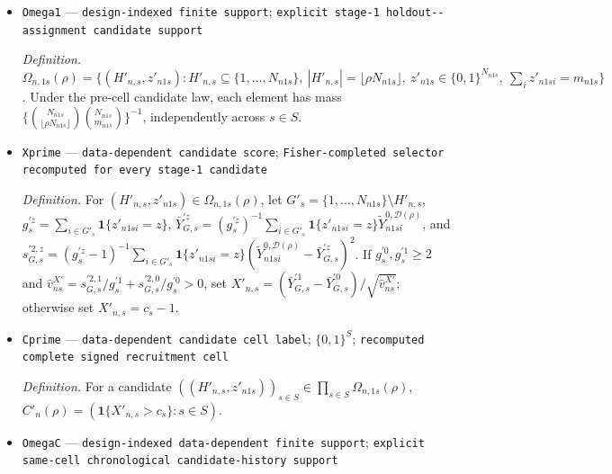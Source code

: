 \documentclass{article}
\begin{document}
\begin{itemize}
  \par\smallskip\noindent\emph{Definition.} For every unit observed in \(\mathcal D_n^{h,\rho}\), the Fisher completion indexed by the same design value sets \(\widetilde Y^{0,\mathcal D(\rho)}_{nksi}(0)=\widetilde Y^{0,\mathcal D(\rho)}_{nksi}(1)=Y^{\mathrm{obs},k}_{nsi}\); no equality between \(Y^{(h)}(1)\) and \(Y^{(h)}(0)\) is imposed when \(h\ne0\).
  \item \texttt{Omega1} --- \texttt{design-\allowbreak{}indexed finite support}; \texttt{explicit stage-\allowbreak{}1 holdout-\allowbreak{}-\allowbreak{}assignment candidate support}
  \par\smallskip\noindent\emph{Definition.} \(\Omega_{n,1s}(\rho)=\{(H'_{n,s},z'_{n1s}):H'_{n,s}\subseteq\{1,\ldots,N_{n1s}\},\ |H'_{n,s}|=\lfloor\rho N_{n1s}\rfloor,\ z'_{n1s}\in\{0,1\}^{N_{n1s}},\ \sum_i z'_{n1si}=m_{n1s}\}\). Under the pre-cell candidate law, each element has mass \(\{\binom{N_{n1s}}{\lfloor\rho N_{n1s}\rfloor}\binom{N_{n1s}}{m_{n1s}}\}^{-1}\), independently across \(s\in S\).
  \item \texttt{Xprime} --- \texttt{data-\allowbreak{}dependent candidate score}; \texttt{Fisher-\allowbreak{}completed selector recomputed for every stage-\allowbreak{}1 candidate}
  \par\smallskip\noindent\emph{Definition.} For \((H'_{n,s},z'_{n1s})\in\Omega_{n,1s}(\rho)\), let \(G'_s=\{1,\ldots,N_{n1s}\}\setminus H'_{n,s}\), \(g_s^{\prime z}=\sum_{i\in G'_s}\mathbf 1\{z'_{n1si}=z\}\), \(\bar Y_{G,s}^{\prime z}=(g_s^{\prime z})^{-1}\sum_{i\in G'_s}\mathbf 1\{z'_{n1si}=z\}\widetilde Y^{0,\mathcal D(\rho)}_{n1si}\), and \(s_{G,s}^{\prime2,z}=(g_s^{\prime z}-1)^{-1}\sum_{i\in G'_s}\mathbf 1\{z'_{n1si}=z\}(\widetilde Y^{0,\mathcal D(\rho)}_{n1si}-\bar Y_{G,s}^{\prime z})^2\). If \(g_s^{\prime0},g_s^{\prime1}\ge2\) and \(\widehat v_{ns}^{X\prime}=s_{G,s}^{\prime2,1}/g_s^{\prime1}+s_{G,s}^{\prime2,0}/g_s^{\prime0}>0\), set \(X'_{n,s}=(\bar Y_{G,s}^{\prime1}-\bar Y_{G,s}^{\prime0})/\sqrt{\widehat v_{ns}^{X\prime}}\); otherwise set \(X'_{n,s}=c_s-1\).
  \item \texttt{Cprime} --- \texttt{data-\allowbreak{}dependent candidate cell label}; \(\{0,1\}^{S}\); \texttt{recomputed complete signed recruitment cell}
  \par\smallskip\noindent\emph{Definition.} For a candidate \(((H'_{n,s},z'_{n1s}))_{s\in S}\in\prod_{s\in S}\Omega_{n,1s}(\rho)\), \(C'_n(\rho)=(\mathbf 1\{X'_{n,s}>c_s\}:s\in S)\).
  \item \texttt{OmegaC} --- \texttt{design-\allowbreak{}indexed data-\allowbreak{}dependent finite support}; \texttt{explicit same-\allowbreak{}cell chronological candidate-\allowbreak{}history support}

\end{itemize}
\end{document}
